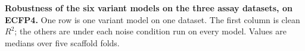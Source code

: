 
\begin{table}[H]
\centering
\caption{\textbf{\SuppFile{} Robustness of the six variant models on the three assay datasets, on ECFP4.}
One row is one variant model on one dataset. The first column is clean $R^2$; the others are \aucnorm{} under each noise condition run on every model. Values are medians over five scaffold folds.}
\label{supp:variant_models_assay}
\small

\end{table}
